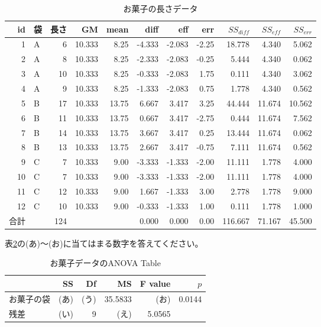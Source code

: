 \documentclass{ltjbook}
\begin{document}
\begin{table}[ht]
	\centering
	\caption{お菓子の長さデータ}
	\begin{tabular}[t]{rlrrrrrrrrr}
		id & 袋 & 長さ  & GM     & mean  & diff   & eff    & err   & $SS_{diff}$ & $SS_{eff}$ & $SS_{err}$ \\\hline\hline
		1  & A & 6   & 10.333 & 8.25  & -4.333 & -2.083 & -2.25 & 18.778      & 4.340      & 5.062      \\
		2  & A & 8   & 10.333 & 8.25  & -2.333 & -2.083 & -0.25 & 5.444       & 4.340      & 0.062      \\
		3  & A & 10  & 10.333 & 8.25  & -0.333 & -2.083 & 1.75  & 0.111       & 4.340      & 3.062      \\
		4  & A & 9   & 10.333 & 8.25  & -1.333 & -2.083 & 0.75  & 1.778       & 4.340      & 0.562      \\
		5  & B & 17  & 10.333 & 13.75 & 6.667  & 3.417  & 3.25  & 44.444      & 11.674     & 10.562     \\
		6  & B & 11  & 10.333 & 13.75 & 0.667  & 3.417  & -2.75 & 0.444       & 11.674     & 7.562      \\
		7  & B & 14  & 10.333 & 13.75 & 3.667  & 3.417  & 0.25  & 13.444      & 11.674     & 0.062      \\
		8  & B & 13  & 10.333 & 13.75 & 2.667  & 3.417  & -0.75 & 7.111       & 11.674     & 0.562      \\
		9  & C & 7   & 10.333 & 9.00  & -3.333 & -1.333 & -2.00 & 11.111      & 1.778      & 4.000      \\
		10 & C & 7   & 10.333 & 9.00  & -3.333 & -1.333 & -2.00 & 11.111      & 1.778      & 4.000      \\
		11 & C & 12  & 10.333 & 9.00  & 1.667  & -1.333 & 3.00  & 2.778       & 1.778      & 9.000      \\
		12 & C & 10  & 10.333 & 9.00  & -0.333 & -1.333 & 1.00  & 0.111       & 1.778      & 1.000      \\\hline
		合計 &   & 124 &        &       & 0.000  & 0.000  & 0.00  & 116.667     & 71.167     & 45.500     \\\hline
	\end{tabular}
	\label{anovaExample1}
\end{table}
表\ref{Example1Ans}の(あ)〜(お)に当てはまる数字を答えてください。
\begin{table}[ht]
	\centering
	\caption{お菓子データのANOVA Table}
	\begin{tabular}{lrrrrr}
		\hline
		      & SS  & Df  & MS      & F value & $p$    \\
		\hline
		お菓子の袋 & (あ) & (う) & 35.5833 & (お)     & 0.0144 \\
		残差    & (い) & 9   & (え)     & 5.0565  &        \\
		\hline
	\end{tabular}
	\label{Example1Ans}
\end{table}
\end{document}
